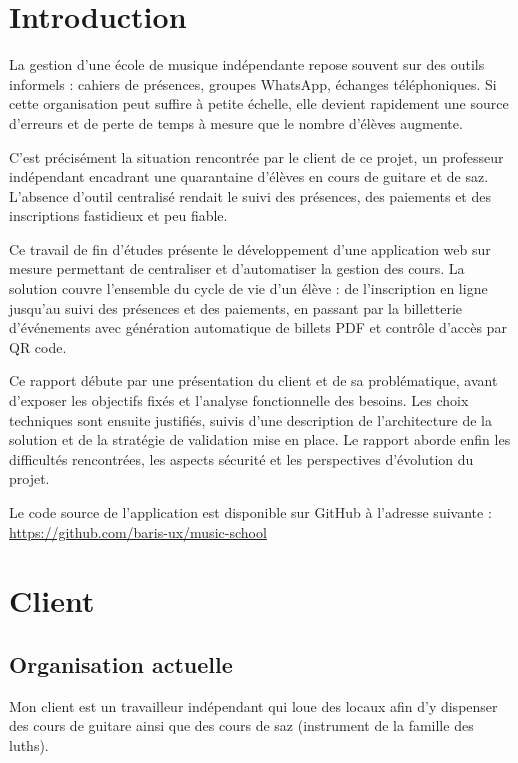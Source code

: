\documentclass{article}
\begin{document}
\newpage


\section{Introduction}

La gestion d'une école de musique indépendante repose souvent sur 
des outils informels : cahiers de présences, groupes WhatsApp, échanges 
téléphoniques. Si cette organisation peut suffire à petite échelle, 
elle devient rapidement une source d'erreurs et de perte de temps 
à mesure que le nombre d'élèves augmente.

C'est précisément la situation rencontrée par le client de ce projet, 
un professeur indépendant encadrant une quarantaine d'élèves en cours 
de guitare et de saz. L'absence d'outil centralisé rendait le suivi 
des présences, des paiements et des inscriptions fastidieux et peu 
fiable.

Ce travail de fin d'études présente le développement d'une application 
web sur mesure permettant de centraliser et d'automatiser la gestion 
des cours. La solution couvre l'ensemble du cycle de vie d'un 
élève : de l'inscription en ligne jusqu'au suivi des présences et des 
paiements, en passant par la billetterie d'événements avec génération 
automatique de billets PDF et contrôle d'accès par QR code.

Ce rapport débute par une présentation du client et de sa 
problématique, avant d'exposer les objectifs fixés et l'analyse 
fonctionnelle des besoins. Les choix techniques sont ensuite 
justifiés, suivis d'une description de l'architecture de la 
solution et de la stratégie de validation mise en place. 
Le rapport aborde enfin les difficultés rencontrées, les 
aspects sécurité et les perspectives d'évolution du projet.

Le code source de l'application est disponible sur GitHub à
l'adresse suivante :
\url{https://github.com/baris-ux/music-school}

\section{Client}

\subsection{Organisation actuelle}

Mon client est un travailleur indépendant qui loue des locaux afin d’y dispenser des cours de guitare ainsi que des cours de saz (instrument de la famille des luths).
\end{document}
